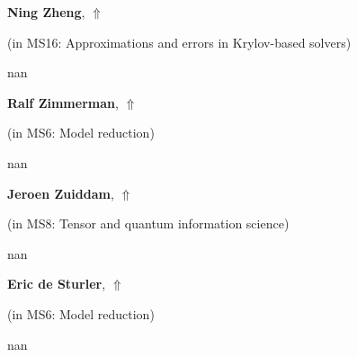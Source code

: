 \documentclass[ILAS2025-program.tex]{subfiles}
\begin{document}
     \hypertarget{down0387}{}\begin{ilasabstract}
    
    \textbf{Ning Zheng},  \hfill \hyperlink{up0387}{$\Uparrow$}
    
    (in {\color{mstitle}MS16: Approximations and errors in Krylov-based solvers})
        
        \mtskip
    nan\end{ilasabstract}
     \hypertarget{down0209}{}\begin{ilasabstract}
    
    \textbf{Ralf Zimmerman},  \hfill \hyperlink{up0209}{$\Uparrow$}
    
    (in {\color{mstitle}MS6: Model reduction})
        
        \mtskip
    nan\end{ilasabstract}
     \hypertarget{down0251}{}\begin{ilasabstract}
    
    \textbf{Jeroen Zuiddam},  \hfill \hyperlink{up0251}{$\Uparrow$}
    
    (in {\color{mstitle}MS8: Tensor and quantum information science})
        
        \mtskip
    nan\end{ilasabstract}
     \hypertarget{down0166}{}\begin{ilasabstract}
    
    \textbf{Eric de Sturler},  \hfill \hyperlink{up0166}{$\Uparrow$}
    
    (in {\color{mstitle}MS6: Model reduction})
        
        \mtskip
    nan\end{ilasabstract}
\end{document}
